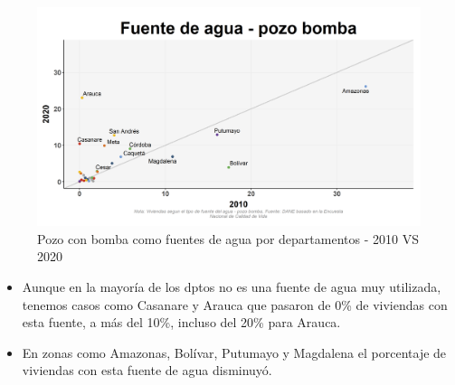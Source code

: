     \begin{figure}[H]
        \caption{Pozo con bomba como fuentes de agua por departamentos - 2010 VS 2020 \label{map_result_2} }
        \begin{center}
        \includegraphics[width=\textwidth,keepaspectratio]{img/var_135_scatter_time.png}
        \end{center}
    \end{figure}
            \begin{itemize}
                    \item Aunque en la mayoría de los dptos no es una fuente de agua muy utilizada, tenemos casos como Casanare y Arauca que pasaron de 0\% de viviendas con esta fuente, a más del 10\%, incluso del 20\% para Arauca.
                    \item En zonas como Amazonas, Bolívar, Putumayo y Magdalena el porcentaje de viviendas con esta fuente de agua disminuyó.
                    \end{itemize}

